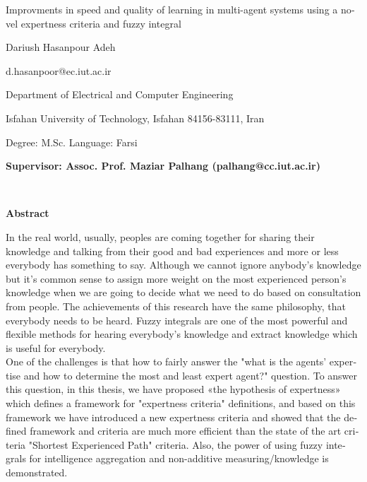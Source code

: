 \thispagestyle{empty}

\begin{latin}
\begin{center}

{\Huge Improvments in speed and quality of learning in multi-agent systems using a novel expertness criteria and fuzzy integral}

\vspace{1cm}

{\LARGE{Dariush Hasanpour Adeh}}

\vspace{0.2cm}

{\small d.hasanpoor@ec.iut.ac.ir}

%

\vspace{0.5cm}

Department of Electrical and Computer Engineering

\vspace{0.2cm}

Isfahan University of Technology, Isfahan 84156-83111, Iran

\vspace{0.2cm}

Degree: M.Sc. \hspace*{3cm} Language: Farsi

\vspace{1cm}

{\small\textbf{Supervisor: Assoc. Prof. Maziar Palhang (palhang@cc.iut.ac.ir)}}
\end{center}
~\vfill



\noindent\textbf{Abstract}

\bgroup
In the real world, usually, peoples are coming together for sharing their knowledge and talking from their good and bad experiences and more or less everybody has something to say. Although we cannot ignore anybody's knowledge but it's common sense to assign more weight on the most experienced person's knowledge when we are going to decide what we need to do based on consultation from people. The achievements of this research have the same philosophy, that everybody needs to be heard. Fuzzy integrals are one of the most powerful and flexible methods for hearing everybody's knowledge and extract knowledge which is useful for everybody.\\
\indent One of the challenges is that how to fairly answer the "what is the agents' expertise and how to determine the most and least expert agent?" question. To answer this question, in this thesis, we have proposed «the hypothesis of expertness» which defines a framework for "expertness criteria" definitions, and based on this framework we have introduced a new expertness criteria and showed that the defined framework and criteria are much more efficient than the state of the art criteria "Shortest Experienced Path" criteria. Also, the power of using fuzzy integrals for intelligence aggregation and non-additive measuring/knowledge is demonstrated.
\egroup


\end{latin}
